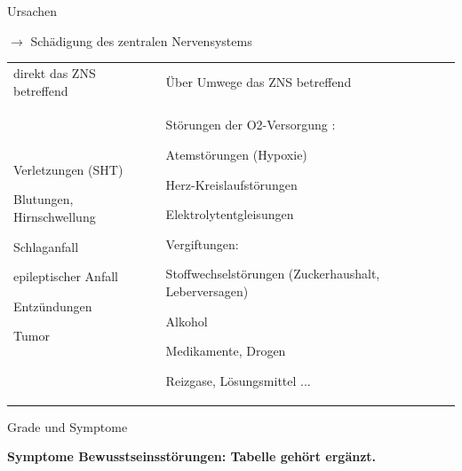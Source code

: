 \documentclass{article}
\newcommand\gZ[1]{\textcolor[rgb]{0.5019608,0.5019608,0.5019608}{#1}}
\begin{document}
{\mdseries\color{black}
Ursachen}

{\mdseries
${\rightarrow}$ Sch\"adigung des zentralen Nervensystems}

\begin{center}
\tablehead{}\begin{supertabular}{|m{6.649cm}|m{6.651cm}|}
\hline
{}\par

 &
\par

\\\hline
{\mdseries direkt das ZNS betreffend}

 &
{\mdseries \"Uber Umwege das ZNS betreffend}

\\\hline
{\mdseries Verletzungen (SHT)}

{\mdseries Blutungen, Hirnschwellung}

{\mdseries Schlaganfall}

{\mdseries epileptischer Anfall}

{\mdseries Entz\"undungen}

{\mdseries \gZ{Tumor}}

 &
{\mdseries St\"orungen der O2-Versorgung :}

Atemst\"orungen  (Hypoxie)

Herz-Kreislaufst\"orungen

Elektrolytentgleisungen

{\mdseries Vergiftungen:}

Stoffwechselst\"orungen (Zuckerhaushalt, Leberversagen)

Alkohol

Medikamente, Drogen

Reizgase,  L\"osungsmittel ...

\\\hline
\end{supertabular}
\end{center}
{\mdseries\color{black}
Grade und Symptome}

{\bfseries\color[rgb]{0.5019608,0.0,0.0}
Symptome Bewusstseinsst\"orungen: Tabelle geh\"ort erg\"anzt.%
%
}
\end{document}
